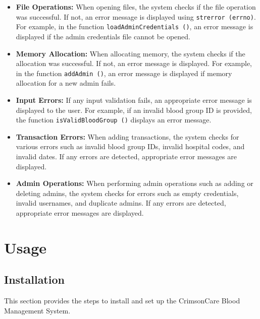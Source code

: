 \documentclass[12pt,a4paper]{report}
\begin{document}
\begin{itemize}
    \item \textbf{File Operations:} When opening files, the system checks if the file operation was successful. If not, an error message is displayed using \texttt{strerror (errno)}. For example, in the function \texttt{loadAdminCredentials ()}, an error message is displayed if the admin credentials file cannot be opened.
    \item \textbf{Memory Allocation:} When allocating memory, the system checks if the allocation was successful. If not, an error message is displayed. For example, in the function \texttt{addAdmin ()}, an error message is displayed if memory allocation for a new admin fails.
    \item \textbf{Input Errors:} If any input validation fails, an appropriate error message is displayed to the user. For example, if an invalid blood group ID is provided, the function \texttt{isValidBloodGroup ()} displays an error message.
    \item \textbf{Transaction Errors:} When adding transactions, the system checks for various errors such as invalid blood group IDs, invalid hospital codes, and invalid dates. If any errors are detected, appropriate error messages are displayed.
    \item \textbf{Admin Operations:} When performing admin operations such as adding or deleting admins, the system checks for errors such as empty credentials, invalid usernames, and duplicate admins. If any errors are detected, appropriate error messages are displayed.
\end{itemize}

\chapter{Usage}
\section{Installation}
This section provides the steps to install and set up the CrimsonCare Blood Management System.
\end{document}

